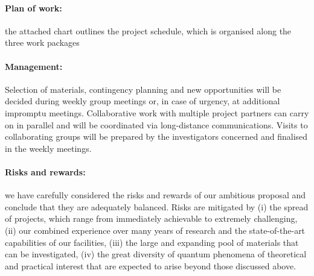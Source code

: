 
\paragraph{Plan of work:} the attached chart outlines the project schedule, which is organised along the three work packages 

\paragraph{Management:} 
Selection of materials, contingency planning and new
opportunities will be decided during weekly group meetings or,
in case of urgency, at additional impromptu meetings.  Collaborative
work with multiple project partners can carry on in parallel and will
be coordinated via long-distance communications. 
Visits to collaborating groups will be
prepared by the investigators concerned and finalised in the weekly 
meetings.

\paragraph{Risks and rewards:} we have carefully considered the risks and
rewards of our ambitious proposal and conclude that they are
adequately balanced. Risks are mitigated by (i) the spread of
projects, which range from immediately achievable to extremely
challenging, (ii) our combined experience over many years of research
and the state-of-the-art capabilities of our facilities, (iii) the large
and expanding pool of materials that can be investigated, (iv) the
great diversity of quantum phenomena of theoretical and practical
interest that are expected to arise beyond those discussed above.

